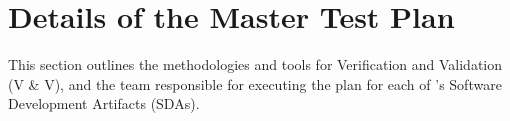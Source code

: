 \section{Details of the Master Test Plan}\label{testplan_highlevel}
This section outlines the methodologies and tools for Verification and
Validation (V \& V), and the team responsible for executing the plan for each
of \progname{}'s Software Development Artifacts (SDAs).



\clearpage



\clearpage



\clearpage



\clearpage



\clearpage

